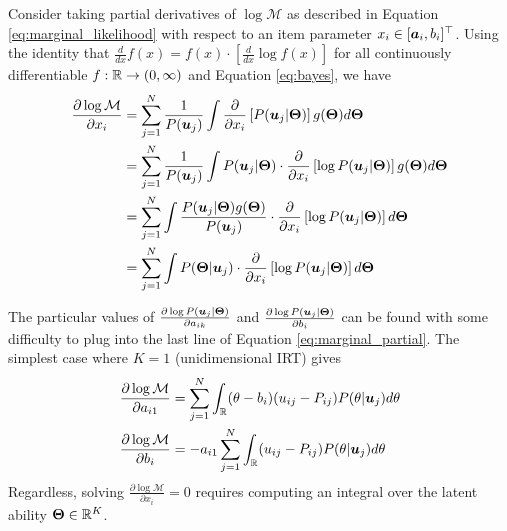 Consider taking partial derivatives of $\log \mathcal{M}$ as described in Equation \ref{eq:marginal_likelihood} with respect to an item parameter $x_i \in [\boldsymbol{a}_i, b_i]^\top$. Using the identity that $\frac{d}{dx}f(x) = f(x) \cdot \left[\frac{d}{dx}\log f(x)\right]$ for all continuously differentiable $f:\mathbb{R} \to (0,\infty)$ and Equation \ref{eq:bayes}, we have 
\begin{equation}
\begin{split}
  \frac{\partial \log \mathcal{M}}{\partial x_i} &= \sum_{j=1}^N \frac{1}{P(\boldsymbol{u}_j)} \int \frac{\partial}{\partial x_i} \left[ P(\boldsymbol{u}_j | \boldsymbol{\Theta}) \right] g(\boldsymbol{\Theta}) d \boldsymbol{\Theta} \\
  &= \sum_{j=1}^N \frac{1}{P(\boldsymbol{u}_j)} \int P(\boldsymbol{u}_j | \boldsymbol{\Theta}) \cdot \frac{\partial}{\partial x_i}\left[\log P(\boldsymbol{u}_j | \boldsymbol{\Theta}) \right] g(\boldsymbol{\Theta}) d \boldsymbol{\Theta} \\
  &= \sum_{j=1}^N \int \frac{P(\boldsymbol{u}_j | \boldsymbol{\Theta})g(\boldsymbol{\Theta})}{P(\boldsymbol{u}_j)}  \cdot \frac{\partial}{\partial x_i}\left[\log P(\boldsymbol{u}_j | \boldsymbol{\Theta}) \right] d\boldsymbol{\Theta} \\
  &= \sum_{j=1}^N \int P(\boldsymbol{\Theta} | \boldsymbol{u}_j) \cdot \frac{\partial}{\partial x_i} \left[\log P(\boldsymbol{u}_j | \boldsymbol{\Theta}) \right] d \boldsymbol{\Theta}
\end{split}
  \label{eq:marginal_partial}
\end{equation}

The particular values of $\frac{\partial \log P(\boldsymbol{u}_j | \boldsymbol{\Theta})}{\partial a_{ik}}$ and $\frac{\partial \log P(\boldsymbol{u}_j | \boldsymbol{\Theta})}{\partial b_i}$ can be found with some difficulty \cite{baker_kim2004} to plug into the last line of Equation \ref{eq:marginal_partial}. The simplest case where $K=1$ (unidimensional IRT) gives
\begin{equation}
\begin{split}
  \frac{\partial \log \mathcal{M}}{\partial a_{i1}} &= \sum_{j=1}^N \int_\mathbb{R} (\theta - b_i)(u_{ij} - P_{ij}) P(\theta | \boldsymbol{u}_j) d \theta \\
  \frac{\partial \log \mathcal{M}}{\partial b_i} &= -a_{i1} \sum_{j=1}^N \int_\mathbb{R} (u_{ij} - P_{ij}) P(\theta | \boldsymbol{u}_j) d\theta
\end{split}
  \label{eq:unidim_marginal_partial}
\end{equation}
Regardless, solving $\frac{\partial \log \mathcal{M}}{\partial x_i} = 0$ requires computing an integral over the latent ability $\boldsymbol{\Theta} \in \mathbb{R}^K$.

